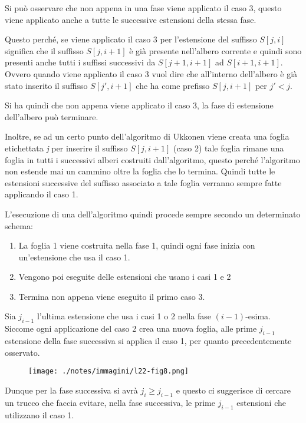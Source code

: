 Si può osservare che non appena in una fase viene applicato il caso 3, questo viene applicato anche a tutte le successive estensioni della stessa fase.

Questo perché, se viene applicato il caso 3 per l'estensione del suffisso $S[j,i]$ significa che il suffisso $S[j,i+1]$ è già presente nell'albero corrente e quindi sono presenti anche tutti i suffissi successivi da $S[j+1,i+1]$ ad $S[i+1,i+1]$.
Ovvero quando viene applicato il caso 3 vuol dire che all'interno dell'albero è già stato inserito il suffisso $S[j',i+1]$ che ha come prefisso $S[j,i+1]$ per $j' < j$.

Si ha quindi che non appena viene applicato il caso 3, la fase di estensione dell'albero può terminare.

Inoltre, se ad un certo punto dell'algoritmo di Ukkonen viene creata una foglia etichettata \textit{j} per inserire il suffisso $S[j,i+1]$ (caso 2) tale foglia rimane una foglia in tutti i successivi alberi costruiti dall'algoritmo, questo perché l'algoritmo non estende mai un cammino oltre la foglia che lo termina. Quindi tutte le estensioni successive del suffisso associato a tale foglia verranno sempre fatte applicando il caso 1.

L'esecuzione di una dell'algoritmo quindi procede sempre secondo un determinato schema:

\begin{enumerate}
	\item La foglia 1 viene costruita nella fase 1, quindi ogni fase inizia con un'estensione che usa il caso 1.
	\item Vengono poi eseguite delle estensioni che usano i casi 1 e 2
	\item Termina non appena viene eseguito il primo caso 3.
\end{enumerate}

Sia $j_{i-1}$ l'ultima estensione che usa i casi 1 o 2 nella fase $(i-1)$-esima. Siccome ogni applicazione del caso 2 crea una nuova foglia, alle prime $j_{i-1}$ estensione della fase successiva si applica il caso 1, per quanto precedentemente osservato.

\begin{figure}[htbp]
	\centering
	\texttt{[image: ./notes/immagini/l22-fig8.png]}
\end{figure}

Dunque per la fase successiva si avrà $j_i \geq j_{i-1}$ e questo ci suggerisce di cercare un trucco che faccia evitare, nella fase successiva, le prime $j_{i-1}$ estensioni che utilizzano il caso 1.

